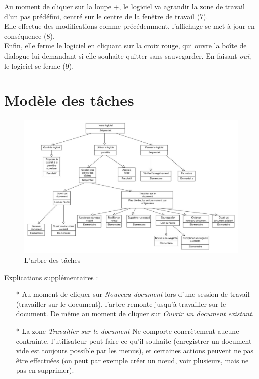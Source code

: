 \documentclass[12pt, a4paper]{article}
\begin{document}
Au moment de cliquer sur la loupe +, le logiciel va agrandir la zone de travail d'un pas prédéfini, centré sur le centre de la fenêtre de travail (7).\\


Elle effectue des modifications comme précédemment, l'affichage se met à jour en conséquence (8).\\


Enfin, elle ferme le logiciel en cliquant sur la croix rouge, qui ouvre la boîte de dialogue lui demandant si elle souhaite quitter sans sauvegarder. En faisant \emph{oui}, le logiciel se ferme (9).

\section{Modèle des tâches}

\begin{figure}[h]
\begin{center}
   \includegraphics[scale = 0.4]{arbre-des-taches.jpg}
	\caption{L'arbre des tâches}
	\end{center}
\end{figure}


Explications supplémentaires : 
\begin{itemize}
\item [*]Au moment de cliquer sur \emph{Nouveau document} lors d'une session de travail (travailler sur le document), l'arbre remonte jusqu'à travailler sur le document. De même au moment de cliquer sur \emph{Ouvrir un document existant}.
\item [*]La zone \emph{Travailler sur le document} Ne comporte concrètement aucune contrainte, l'utilisateur peut faire ce qu'il souhaite (enregistrer un document vide est toujours possible par les menus), et certaines actions peuvent ne pas être effectuées (on peut par exemple créer un nœud, voir plusieurs, mais ne pas en supprimer).
\end{itemize}
\end{document}
